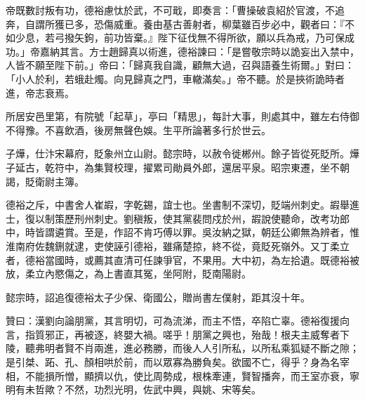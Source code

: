 \begin{pinyinscope}
 帝既數討叛有功，德裕慮忲於武，不可戢，即奏言：「曹操破袁紹於官渡，不追奔，自謂所獲已多，恐傷威重。養由基古善射者，柳葉雖百步必中，觀者曰：『不如少息，若弓撥矢鉤，前功皆棄。』陛下征伐無不得所欲，願以兵為戒，乃可保成功。」帝嘉納其言。方士趙歸真以術進，德裕諫曰：「是嘗敬宗時以詭妄出入禁中，人皆不願至陛下前。」帝曰：「歸真我自識，顧無大過，召與語養生術爾。」對曰：「小人於利，若蛾赴燭。向見歸真之門，車轍滿矣。」帝不聽。於是挾術詭時者進，帝志衰焉。



 所居安邑里第，有院號「起草」，亭曰「精思」，每計大事，則處其中，雖左右侍御不得豫。不喜飲酒，後房無聲色娛。生平所論著多行於世云。



 子燁，仕汴宋幕府，貶象州立山尉。懿宗時，以赦令徙郴州。餘子皆從死貶所。燁子延古，乾符中，為集賢校理，擢累司勛員外郎，還居平泉。昭宗東遷，坐不朝謁，貶衛尉主簿。



 德裕之斥，中書舍人崔嘏，字乾錫，誼士也。坐書制不深切，貶端州刺史。嘏舉進士，復以制策歷刑州刺史。劉稹叛，使其黨裴問戍於州，嘏說使聽命，改考功郎中，時皆謂遴賞。至是，作詔不肯巧傅以罪。吳汝納之獄，朝廷公卿無為辨者，惟淮南府佐魏鉶就逮，吏使誣引德裕，雖痛楚掠，終不從，竟貶死嶺外。又丁柔立者，德裕當國時，或薦其直清可任諫爭官，不果用。大中初，為左拾遺。既德裕被放，柔立內愍傷之，為上書直其冤，坐阿附，貶南陽尉。



 懿宗時，詔追復德裕太子少保、衛國公，贈尚書左僕射，距其沒十年。



 贊曰：漢劉向論朋黨，其言明切，可為流涕，而主不悟，卒陷亡辜。德裕復援向言，指質邪正，再被逐，終嬰大禍。嗟乎！朋黨之興也，殆哉！根夫主威奪者下陵，聽弗明者賢不肖兩進，進必務勝，而後人人引所私，以所私乘狐疑不斷之隙；是引桀、跖、孔、顏相哄於前，而以眾寡為勝負矣。欲國不亡，得乎？身為名宰相，不能損所憎，顯擠以仇，使比周勢成，根株牽連，賢智播奔，而王室亦衰，寧明有未哲歟？不然，功烈光明，佐武中興，與姚、宋等矣。



\end{pinyinscope}